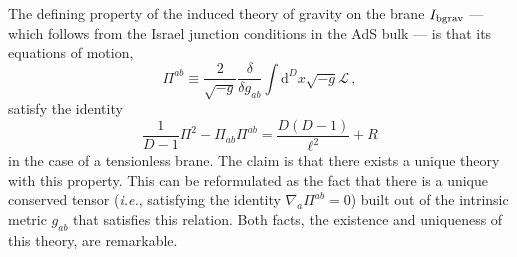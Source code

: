 \documentclass[11pt]{article}
\newcommand{\diff}{\mathrm{d}}
\begin{document}
{%
The defining property of the induced theory of gravity on the brane $I_{\rm bgrav}$ ---which follows from the Israel junction conditions in the AdS bulk \cite{Israel:1966rt}--- is that its equations of motion,
\begin{equation}
\Pi^{ab}\equiv \frac{2}{\sqrt{-g}}\frac{\delta}{\delta g_{ab}}\int \diff ^{D}x\sqrt{-g}\mathcal{L}\, ,
\end{equation}
satisfy the identity \cite{Kraus:1999di}
\begin{equation}\label{eq:Piid1}
\frac{1}{D-1}\Pi^2-\Pi_{ab}\Pi^{ab}=\frac{D(D-1)}{\ell^2}+R
\end{equation}
in the case of a tensionless brane.
The claim is that there exists a unique theory with this property. This can be reformulated as the fact that there is a unique conserved tensor (\textit{i.e.}, satisfying the identity $\nabla_{a}\Pi^{ab}=0$) built out of the intrinsic metric $g_{ab}$ that satisfies this relation.  Both facts, the existence and uniqueness of this theory, are remarkable. 

}
\end{document}
